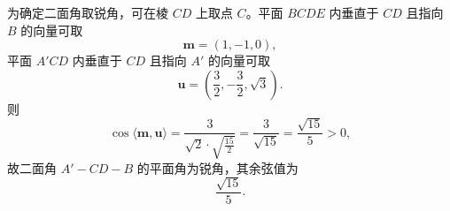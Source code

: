 \begin{answer}
为确定二面角取锐角，可在棱 $CD$ 上取点 $C$。平面 $BCDE$ 内垂直于 $CD$ 且指向 $B$ 的向量可取
\nopagebreak[4]
\[\boldsymbol m=(1,-1,0),\]
平面 $A'CD$ 内垂直于 $CD$ 且指向 $A'$ 的向量可取
\nopagebreak[4]
\[\boldsymbol u=\left(\frac32,-\frac32,\sqrt3\right).\]
则
\nopagebreak[4]
\[\cos\langle\boldsymbol m,\boldsymbol u\rangle
=\frac{3}{\sqrt2\cdot\sqrt{\frac{15}{2}}}
=\frac{3}{\sqrt{15}}=\frac{\sqrt{15}}5>0,\]
故二面角 $A'-CD-B$ 的平面角为锐角，其余弦值为
\nopagebreak[4]
\[\frac{\sqrt{15}}5.\]



\end{answer}
